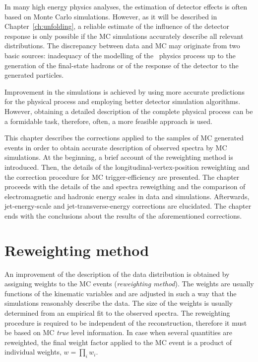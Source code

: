 In many high energy physics analyses, the estimation of detector effects is often based on Monte Carlo simulations. However, as it will be described in Chapter~\ref{ch:unfolding}, a reliable estimate of the influence of the detector response is only possible if the MC simulations accurately describe all relevant distributions. %
 The discrepancy between data and MC may originate from two basic sources: inadequacy of the modelling of the \ep~physics process up to the generation of the final-state hadrons or of the response of the detector to the generated particles.
 
Improvement in the simulations is achieved by using more accurate predictions for the physical process and employing better detector simulation algorithms. However, obtaining a detailed description of the complete physical process can be a formidable task, therefore, often, a more feasible approach is used.

This chapter describes the corrections applied to the samples of MC generated events in order to obtain accurate description of observed spectra by MC simulations. At the beginning, a brief account of the reweighting method is introduced. Then, the details of the longitudinal-vertex-position reweighting and the correction procedure for MC trigger-efficiency are presented. The chapter proceeds with the details of the \qsq and \etjetb spectra reweigthing and the comparison of electromagnetic and hadronic energy scales in data and simulations. Afterwards, jet-energy-scale and jet-transverse-energy corrections are elucidated. The chapter ends with the conclusions about the results of the aforementioned corrections.

\section{Reweighting method}

An improvement of the description of the data distribution is obtained by assigning weights to the MC events (\emph{reweighting method}). The weights are usually functions of the kinematic variables and are adjusted in such a way that the simulations reasonably describe the data. The size of the weights is usually determined from an empirical fit to the observed spectra. The reweighting procedure is required to be independent of the reconstruction, therefore it must be based on MC \emph{true} level information. In case when several quantities are reweighted, the final weight factor applied to the MC event is a product of individual weights, $w = \prod_i w_i$. 

